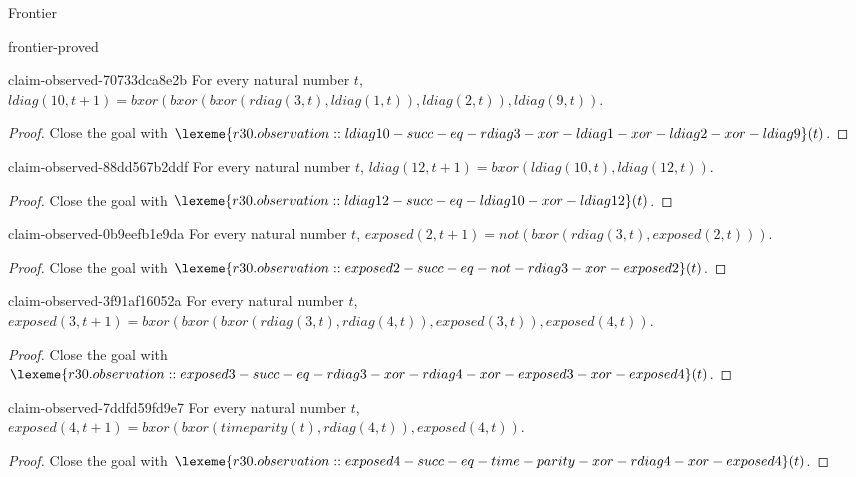 \begin{lexlean}{Frontier}
\begin{section}{frontier-proved}
\begin{theorem}{claim-observed-70733dca8e2b}
For every natural number \(t\), \(ldiag(10, t + 1) = bxor(bxor(bxor(rdiag(3, t), ldiag(1, t)), ldiag(2, t)), ldiag(9, t))\).
\begin{proof}
Close the goal with \(\lexeme{r30.observation::ldiag10-succ-eq-rdiag3-xor-ldiag1-xor-ldiag2-xor-ldiag9}(t)\).
\end{proof}
\end{theorem}

\begin{theorem}{claim-observed-88dd567b2ddf}
For every natural number \(t\), \(ldiag(12, t + 1) = bxor(ldiag(10, t), ldiag(12, t))\).
\begin{proof}
Close the goal with \(\lexeme{r30.observation::ldiag12-succ-eq-ldiag10-xor-ldiag12}(t)\).
\end{proof}
\end{theorem}

\begin{theorem}{claim-observed-0b9eefb1e9da}
For every natural number \(t\), \(exposed(2, t + 1) = not(bxor(rdiag(3, t), exposed(2, t)))\).
\begin{proof}
Close the goal with \(\lexeme{r30.observation::exposed2-succ-eq-not-rdiag3-xor-exposed2}(t)\).
\end{proof}
\end{theorem}

\begin{theorem}{claim-observed-3f91af16052a}
For every natural number \(t\), \(exposed(3, t + 1) = bxor(bxor(bxor(rdiag(3, t), rdiag(4, t)), exposed(3, t)), exposed(4, t))\).
\begin{proof}
Close the goal with \(\lexeme{r30.observation::exposed3-succ-eq-rdiag3-xor-rdiag4-xor-exposed3-xor-exposed4}(t)\).
\end{proof}
\end{theorem}

\begin{theorem}{claim-observed-7ddfd59fd9e7}
For every natural number \(t\), \(exposed(4, t + 1) = bxor(bxor(timeparity(t), rdiag(4, t)), exposed(4, t))\).
\begin{proof}
Close the goal with \(\lexeme{r30.observation::exposed4-succ-eq-time-parity-xor-rdiag4-xor-exposed4}(t)\).
\end{proof}
\end{theorem}


\end{section}
\end{lexlean}
